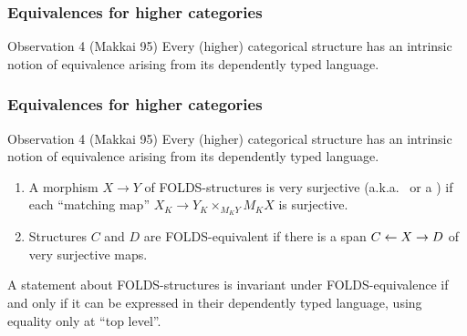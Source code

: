 \documentclass{beamer}
\begin{document}
\begin{frame}[t]
  \frametitle{Equivalences for higher categories}
  \begin{block}{Observation 4 (Makkai 95)}
    Every (higher) categorical structure has an intrinsic notion of \alert<1>{equivalence} arising from its dependently typed language.
  \end{block}
  \begin{enumerate}
  \end{enumerate}
\end{frame}

\begin{frame}[t]
  \frametitle{Equivalences for higher categories}
  \begin{block}{Observation 4 (Makkai 95)}
    Every (higher) categorical structure has an intrinsic notion of {equivalence} arising from its dependently typed language.
  \end{block}
  \begin{enumerate}
  \item A morphism $X\to Y$ of FOLDS-structures is \alert<1>{very surjective} (a.k.a.\  or a ) if each ``matching map'' $X_K \to Y_K \times_{M_K Y} M_K X$ is surjective.
  \item Structures $C$ and $D$ are \alert<1>{FOLDS-equivalent} if there is a span \( C \leftarrow X \to D\) of very surjective maps.
  \end{enumerate}
  \pause
  \begin{theorem}[Makkai 95]
    A {statement} about FOLDS-structures is invariant under FOLDS-equivalence \alert<2>{if and only if} it can be expressed in their dependently typed language, using equality only at ``top level''.
  \end{theorem}
\end{frame}
\end{document}
